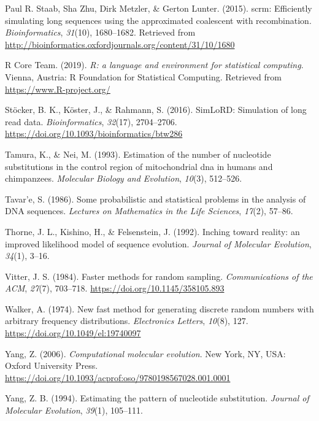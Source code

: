 \documentclass[12pt,]{article}
\begin{document}
\leavevmode\hypertarget{ref-Paul_R._Staab_2015}{}%
Paul R. Staab, Sha Zhu, Dirk Metzler, \& Gerton Lunter. (2015). scrm:
Efficiently simulating long sequences using the approximated coalescent
with recombination. \emph{Bioinformatics}, \emph{31}(10), 1680--1682.
Retrieved from
\url{http://bioinformatics.oxfordjournals.org/content/31/10/1680}

\leavevmode\hypertarget{ref-R_Core_Team_2019}{}%
R Core Team. (2019). \emph{R: a language and environment for statistical
computing}. Vienna, Austria: R Foundation for Statistical Computing.
Retrieved from \url{https://www.R-project.org/}

\leavevmode\hypertarget{ref-St_cker_2016}{}%
Stöcker, B. K., Köster, J., \& Rahmann, S. (2016). SimLoRD: Simulation
of long read data. \emph{Bioinformatics}, \emph{32}(17), 2704--2706.
\url{https://doi.org/10.1093/bioinformatics/btw286}

\leavevmode\hypertarget{ref-TN93}{}%
Tamura, K., \& Nei, M. (1993). Estimation of the number of nucleotide
substitutions in the control region of mitochondrial dna in humans and
chimpanzees. \emph{Molecular Biology and Evolution}, \emph{10}(3),
512--526.

\leavevmode\hypertarget{ref-Tavare_1986gtr}{}%
Tavar\a'e, S. (1986). Some probabilistic and statistical problems in the
analysis of DNA sequences. \emph{Lectures on Mathematics in the Life
Sciences}, \emph{17}(2), 57--86.

\leavevmode\hypertarget{ref-Thorne_1992}{}%
Thorne, J. L., Kishino, H., \& Felsenstein, J. (1992). Inching toward
reality: an improved likelihood model of sequence evolution.
\emph{Journal of Molecular Evolution}, \emph{34}(1), 3--16.

\leavevmode\hypertarget{ref-Vitter_1984}{}%
Vitter, J. S. (1984). Faster methods for random sampling.
\emph{Communications of the ACM}, \emph{27}(7), 703--718.
\url{https://doi.org/10.1145/358105.893}

\leavevmode\hypertarget{ref-Walker_1974}{}%
Walker, A. (1974). New fast method for generating discrete random
numbers with arbitrary frequency distributions. \emph{Electronics
Letters}, \emph{10}(8), 127. \url{https://doi.org/10.1049/el:19740097}

\leavevmode\hypertarget{ref-Yang_2006}{}%
Yang, Z. (2006). \emph{Computational molecular evolution}. New York, NY,
USA: Oxford University Press.
\url{https://doi.org/10.1093/acprof:oso/9780198567028.001.0001}

\leavevmode\hypertarget{ref-Yang_1994}{}%
Yang, Z. B. (1994). Estimating the pattern of nucleotide substitution.
\emph{Journal of Molecular Evolution}, \emph{39}(1), 105--111.
\end{document}
